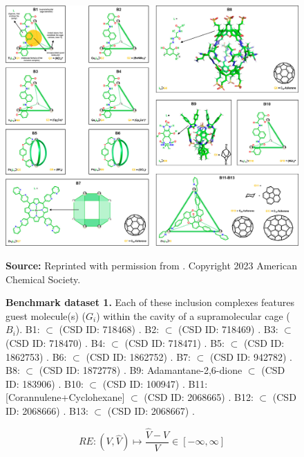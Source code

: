 \documentclass[Ingles]{phdthesis}
\begin{document}
\begin{figure}[H]
  \centerline{\includegraphics[scale=0.9]{images/benchmark-dataset-1.png}}
  \centerline{\tiny{\textbf{Source:} Reprinted with permission from \cite{guerra2023B}. Copyright 2023 American Chemical Society.}}
  \caption[Benchmark dataset 1]{\textbf{Benchmark dataset 1.} Each of these inclusion complexes features guest molecule(s) ($G_i$) within the cavity of a supramolecular cage ($B_i$). B1:  $\subset$  (CSD ID: 718468) \cite{pluth2008}. B2:  $\subset$  (CSD ID: 718469) \cite{pluth2008}. B3:  $\subset$  (CSD ID: 718470) \cite{pluth2008}. B4:  $\subset$  (CSD ID: 718471) \cite{pluth2008}. B5:  $\subset$  (CSD ID: 1862753) \cite{steel2018}. B6:  $\subset$  (CSD ID: 1862752) \cite{steel2018}. B7:  $\subset$  (CSD ID: 942782) \cite{nakamura2013}. B8:  $\subset$  (CSD ID: 1872778) \cite{eichstaedt2019}. B9: Adamantane-2,6-dione $\subset$  (CSD ID: 183906) \cite{johnson2002}. B10:  $\subset$  (CSD ID: 100947) \cite{caulder1998}. B11: [Corannulene+Cyclohexane] $\subset$  (CSD ID: 2068665) \cite{yang2021}. B12:  $\subset$  (CSD ID: 2068666) \cite{yang2021}. B13:  $\subset$  (CSD ID: 2068667) \cite{yang2021}.}
  \label{fig:benchmark-dataset-1}
\end{figure}

\begin{equation}
  RE \colon (V,\hat{V}) \mapsto \frac{\hat{V} - V}{V} \in [-\infty,\infty]
  \label{eq:re}
\end{equation}
\end{document}

